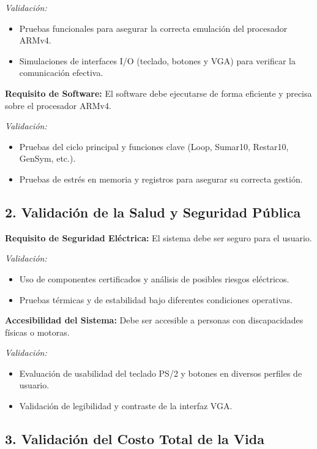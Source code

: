 \documentclass[conference]{IEEEtran}
\begin{document}
\textit{Validación:}
\begin{itemize}
	\item Pruebas funcionales para asegurar la correcta emulación del procesador ARMv4.
	\item Simulaciones de interfaces I/O (teclado, botones y VGA) para verificar la comunicación efectiva.
\end{itemize}

\textbf{Requisito de Software:} El software debe ejecutarse de forma eficiente y precisa sobre el procesador ARMv4.

\textit{Validación:}
\begin{itemize}
	\item Pruebas del ciclo principal y funciones clave (Loop, Sumar10, Restar10, GenSym, etc.).
	\item Pruebas de estrés en memoria y registros para asegurar su correcta gestión.
\end{itemize}

\subsection*{2. Validación de la Salud y Seguridad Pública}

\textbf{Requisito de Seguridad Eléctrica:} El sistema debe ser seguro para el usuario.

\textit{Validación:}
\begin{itemize}
	\item Uso de componentes certificados y análisis de posibles riesgos eléctricos.
	\item Pruebas térmicas y de estabilidad bajo diferentes condiciones operativas.
\end{itemize}

\textbf{Accesibilidad del Sistema:} Debe ser accesible a personas con discapacidades físicas o motoras.

\textit{Validación:}
\begin{itemize}
	\item Evaluación de usabilidad del teclado PS/2 y botones en diversos perfiles de usuario.
	\item Validación de legibilidad y contraste de la interfaz VGA.
\end{itemize}

\subsection*{3. Validación del Costo Total de la Vida}
\end{document}
